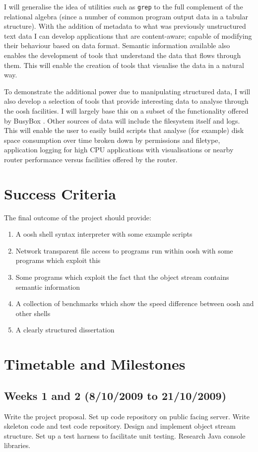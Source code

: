 \documentclass[12pt]{article}
\begin{document}
I will generalise the idea of utilities such as \texttt{grep} to the
full complement of the relational algebra (since a number of common
program output data in a tabular structure). With the addition of
metadata to what was previously unstructured text data I can develop
applications that are content-aware; capable of modifying their
behaviour based on data format. Semantic information available also
enables the development of tools that understand the data that flows
through them. This will enable the creation of tools that visualise
the data in a natural way.

To demonstrate the additional power due to manipulating structured
data, I will also develop a selection of tools that provide
interesting data to analyse through the oosh facilities. I will
largely base this on a subset of the functionality offered by BusyBox
\cite{busybox}. Other sources of data will include the filesystem
itself and logs. This will enable the user to easily build scripts
that analyse (for example) disk space consumption over time broken
down by permissions and filetype, application logging for high CPU
applications with visualisations or nearby router performance versus
facilities offered by the router.

\section*{Success Criteria}
The final outcome of the project should provide:

\begin{enumerate}
\item A oosh shell syntax interpreter with some example scripts
\item Network transparent file access to programs run within oosh with
  some programs which exploit this
\item Some programs which exploit the fact that the object stream
  contains semantic information
\item A collection of benchmarks which show the speed difference
  between oosh and other shells
\item A clearly structured dissertation
\end{enumerate}

\section*{Timetable and Milestones}

\subsection*{Weeks 1 and 2 (8/10/2009 to 21/10/2009)}
Write the project proposal. Set up code repository on public facing
server. Write skeleton code and test code repository. Design and
implement object stream structure. Set up a test harness to facilitate
unit testing. Research Java console libraries.
\end{document}
